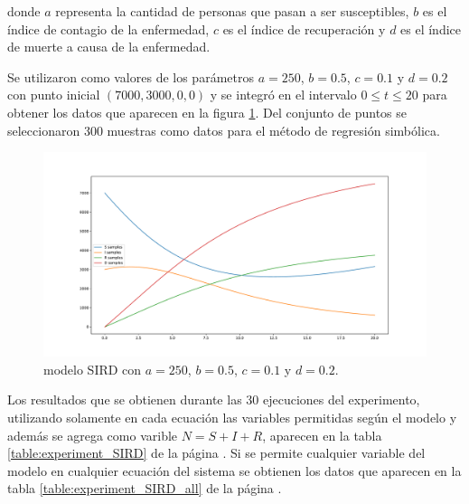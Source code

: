 donde $a$ representa la cantidad de personas que pasan a ser susceptibles, $b$ es el índice de contagio de la enfermedad, $c$ es el índice de recuperación y $d$ es el índice de muerte a causa de la enfermedad.

Se utilizaron como valores de los parámetros $a = 250$, $b = 0.5$, $c = 0.1$ y $d = 0.2$ con punto inicial $(7000, 3000, 0, 0)$ y se integró en el intervalo $0 \leq t \leq 20$ para obtener los datos que aparecen en la figura \ref{fig:SIRD}. Del conjunto de puntos se seleccionaron 300 muestras como datos para el método de regresión simbólica.

\begin{figure}[h]
    \centering
    \includegraphics[width=\textwidth]{"figures/SIRD.pdf"}
    \caption{modelo SIRD con $a = 250$, $b = 0.5$, $c = 0.1$ y $d = 0.2$.}
    \label{fig:SIRD}
\end{figure}

Los resultados que se obtienen durante las 30 ejecuciones del experimento, utilizando solamente en cada ecuación las variables permitidas según el modelo y además se agrega como varible $N=S + I + R$, aparecen en la tabla \ref{table:experiment_SIRD} de la página \pageref{table:experiment_SIRD}. Si se permite cualquier variable del modelo en cualquier ecuación del sistema se obtienen los datos que aparecen en la tabla \ref{table:experiment_SIRD_all} de la página \pageref{table:experiment_SIRD_all}.

